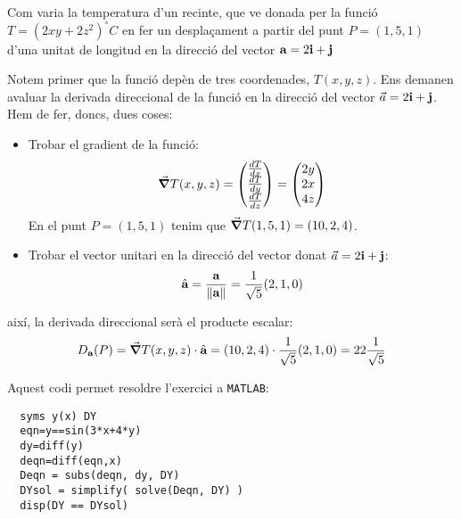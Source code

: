 \Exercise Com varia la temperatura d'un recinte, que ve donada per la funció $T=(2xy+2z^2)^{\circ}C$ en fer un desplaçament a partir del punt $P=(1,5,1)$ d'una unitat de longitud en la direcció del vector $\textbf{a}=2\textbf{i}+\textbf{j}$
\label{ex:derivadadireccional1}
\Answer

Notem primer que la funció depèn de tres coordenades, $T(x,y,z)$. 
Ens demanen avaluar la derivada direccional de la funció en la direcció del vector $\vec{a}=2\textbf{i}+\textbf{j}$. Hem de fer, doncs, dues coses:
\begin{itemize}
  \item Trobar el gradient de la funció:
  \[
    \grad{T(x,y,z)}=\begin{pmatrix}\frac{dT}{dx}\\\frac{dT}{dy}\\\frac{dT}{dz}\end{pmatrix}= \begin{pmatrix}2y\\2x\\4z\end{pmatrix} 
  \]
  En el punt $P=(1,5,1)$ tenim que $\grad{T(1,5,1)}=(10,2,4)$.
  \item Trobar el vector unitari en la direcció del vector donat $\vec{a}=2\textbf{i}+\textbf{j}$:
  \[
    \hat{\textbf{a}}=  \frac{\textbf{a}}{\norm{\textbf{a}}}=\frac{1}{\sqrt{5}}(2,1,0)
  \]
\end{itemize}

així, la derivada direccional serà el producte escalar:
\[
  D_{\textbf{a}}(P)=  \grad{T(x,y,z)} \cdot \hat{\textbf{a}} = (10,2,4) \cdot \frac{1}{\sqrt{5}}(2,1,0) = 22\frac{1}{\sqrt{5}}
\]

Aquest codi permet resoldre l'exercici a \texttt{MATLAB}:
\begin{lstlisting}[style=Matlab-editor]
  % resolució exercici
  syms y(x) DY
  eqn=y==sin(3*x+4*y)
  dy=diff(y)
  deqn=diff(eqn,x)
  Deqn = subs(deqn, dy, DY)
  DYsol = simplify( solve(Deqn, DY) )
  disp(DY == DYsol)
  \end{lstlisting}

\blacksquare 